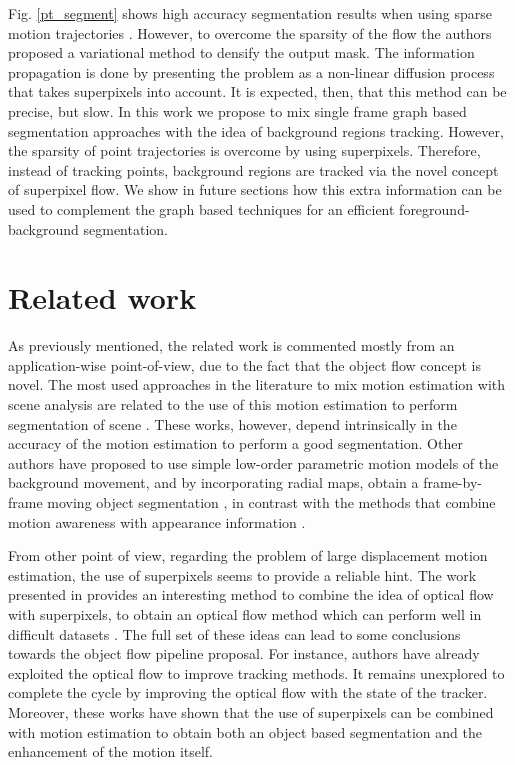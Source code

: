 Fig. \ref{pt_segment} shows high accuracy segmentation results when using sparse motion trajectories \cite{c34}. However, to overcome 
the sparsity of the flow the authors proposed a variational method to densify the output mask. The information propagation is done 
by presenting the problem as a non-linear diffusion process that takes superpixels into account. It is expected, then, that this 
method can be precise, but slow.
In this work we propose to mix single frame graph based segmentation approaches with the idea 
of background regions tracking. However, the sparsity of point trajectories is 
overcome by using superpixels. Therefore, instead of tracking points, background regions are tracked via the novel concept of 
superpixel flow. 
We show in future sections how this extra information can be used to complement the
graph based techniques for an efficient foreground-background segmentation. 

\section{Related work}

As previously mentioned, the related work is commented mostly from an application-wise point-of-view, due to the fact that 
the object flow concept is novel. The most used approaches in the literature to mix motion estimation with scene analysis
are related to the use of this motion estimation to perform segmentation of scene \cite{c33}\cite{c34}. These works, however, depend 
intrinsically in the accuracy of the motion estimation to perform a good segmentation. Other authors have proposed to use simple 
low-order parametric motion models of the background movement, and by incorporating radial maps, obtain a frame-by-frame 
moving object segmentation \cite{c36}, in contrast with the methods that combine motion awareness with appearance information \cite{c35}. 

From other point of view, regarding the problem of large displacement motion estimation, the use of superpixels seems to provide a reliable hint. The work presented in \cite{c39} 
provides an interesting method to combine the idea of optical flow with superpixels, to obtain an optical flow method which can perform well in difficult datasets \cite{c27}. 
The full set of these ideas can lead to some conclusions towards the object flow pipeline proposal. For instance, authors have already exploited the optical flow 
to improve tracking methods. It remains unexplored to complete the cycle by improving the optical flow with the state of the tracker. Moreover, these works have shown 
that the use of superpixels can be combined with motion estimation to obtain both an object based segmentation and the enhancement of the motion itself.

